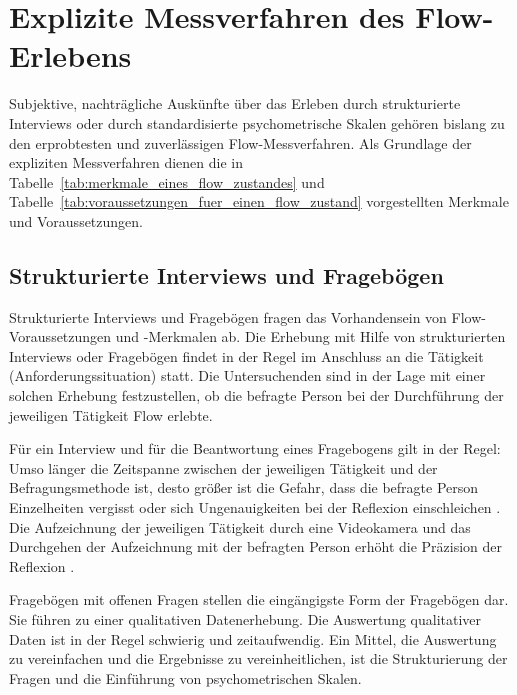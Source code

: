 

\section{Explizite Messverfahren des Flow-Erlebens} 

\label{sec:explizite_messverfahren_des_flow_erlebens}

Subjektive, nachträgliche Auskünfte über das Erleben durch strukturierte Interviews oder durch standardisierte psychometrische Skalen gehören bislang zu den erprobtesten und zuverlässigen Flow-Messverfahren. Als Grundlage der expliziten Messverfahren dienen die in Tabelle~\ref{tab:merkmale_eines_flow_zustandes} und Tabelle~\ref{tab:voraussetzungen_fuer_einen_flow_zustand} vorgestellten Merkmale und Voraussetzungen.

\subsection{Strukturierte Interviews und Fragebögen} 

\label{sub:strukturierte_interviews_und_fragebogen}

Strukturierte Interviews und Fragebögen fragen das Vorhandensein von Flow-Voraussetzungen und -Merkmalen ab. Die Erhebung mit Hilfe von strukturierten Interviews oder Fragebögen findet in der Regel im Anschluss an die Tätigkeit (Anforderungssituation) statt. Die Untersuchenden sind in der Lage mit einer solchen Erhebung festzustellen, ob die befragte Person bei der Durchführung der jeweiligen Tätigkeit Flow erlebte.

Für ein Interview und für die Beantwortung eines Fragebogens gilt in der Regel: Umso länger die Zeitspanne zwischen der jeweiligen Tätigkeit und der Befragungsmethode ist, desto größer ist die Gefahr, dass die befragte Person Einzelheiten vergisst oder sich Ungenauigkeiten bei der Reflexion einschleichen \citep[][S.~87]{Henk2014}. Die Aufzeichnung der jeweiligen Tätigkeit durch eine Videokamera und das Durchgehen der Aufzeichnung mit der befragten Person erhöht die Präzision der Reflexion \citep[Video-Recall,][S.~566]{Leuchter2006}.

Fragebögen mit offenen Fragen stellen die eingängigste Form der Fragebögen dar. Sie führen zu einer qualitativen Datenerhebung. Die Auswertung qualitativer Daten ist in der Regel schwierig und zeitaufwendig. Ein Mittel, die Auswertung zu vereinfachen und die Ergebnisse zu vereinheitlichen, ist die Strukturierung der Fragen und die Einführung von psychometrischen Skalen.

